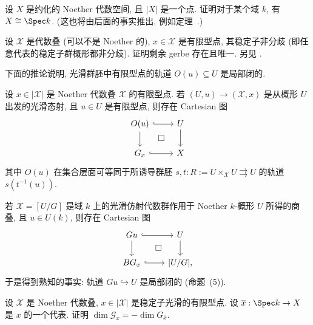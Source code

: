 \begin{exercise}[细节]\label{src:4.5.17}
设 $X$ 是约化的 Noether 代数空间, 且 $|X|$ 是一个点. 证明对于某个域 $k$, 有 $X\cong\Spec k$. (这也将由后面的事实推出, 例如定理~.)
\end{exercise}
\begin{exercise}[技术性]\label{src:4.5.18}
设 $\mathcal X$ 是代数叠 (可以不是 Noether 的), $x\in\mathcal X$ 是有限型点, 其稳定子非分歧 (即任意代表的稳定子群概形都非分歧). 证明剩余 gerbe 存在且唯一. 另见 \cite[Tag 06G3]{SP}.
\end{exercise}
下面的推论说明, 光滑群胚中有限型点的轨道 $O(u)\subseteq U$ 是局部闭的.
\begin{corollary}\label{src:4.5.19}
设 $x\in|\mathcal X|$ 是 Noether 代数叠 $\mathcal X$ 的有限型点. 若 $(U,u)\to(\mathcal X,x)$ 是从概形 $U$ 出发的光滑态射, 且 $u\in U$ 是有限型点, 则存在 Cartesian 图
\begin{equation}\label{src:4.5.20}
\begin{tikzcd}
O(u)\arrow[r,hook]\arrow[d]&U\arrow[d]\\
\mathcal G_x\arrow[r,hook]\arrow[ur,phantom,"\square" description]&\mathcal X
\end{tikzcd}
\end{equation}
其中 $O(u)$ 在集合层面可等同于所诱导群胚 $s,t:R:=U\times_{\mathcal X}U\rightrightarrows U$ 的轨道 $s(t^{-1}(u))$.
\end{corollary}
\begin{samepage}
\begin{remark}\label{src:4.5.21}
若 $\mathcal X=[U/G]$ 是域 $k$ 上的光滑仿射代数群作用于 Noether $k$-概形 $U$ 所得的商叠, 且 $u\in U(k)$, 则存在 Cartesian 图
\[
\begin{tikzcd}
Gu\arrow[r,hook]\arrow[d]&U\arrow[d]\\
BG_x\arrow[r,hook]\arrow[ur,phantom,"\square" description]&{[U/G]},
\end{tikzcd}
\]
于是得到熟知的事实: 轨道 $Gu\hookrightarrow U$ 是局部闭的 (命题~(5)).
\end{remark}
\end{samepage}
\begin{exercise}\label{src:4.5.22}
设 $\mathcal X$ 是 Noether 代数叠, $x\in|\mathcal X|$ 是稳定子光滑的有限型点. 设 $\overline x:\Spec k\to\mathcal X$ 是 $x$ 的一个代表. 证明 $\dim\mathcal G_x=-\dim G_{\overline x}$.
\end{exercise}
